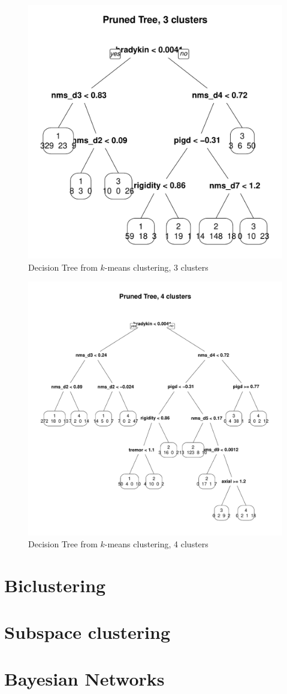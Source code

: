 \documentclass[letterpaper,12pt]{article}
\begin{document}
\begin{figure}[ht]
  \centering
  \includegraphics[width=0.8\linewidth]{dtree-kmeans-pruned-3.pdf}
  \caption{Decision Tree from $k$-means clustering, 3 clusters}
  \label{fig:kmeans-dtree-3}
\end{figure}

\begin{figure}[ht]
  \centering
  \includegraphics[width=0.8\linewidth]{dtree-kmeans-pruned-4.pdf}
  \caption{Decision Tree from $k$-means clustering, 4 clusters}
  \label{fig:kmeans-dtree-4}
\end{figure}


\section{Biclustering}

\section{Subspace clustering}


\section{Bayesian Networks}
\end{document}

